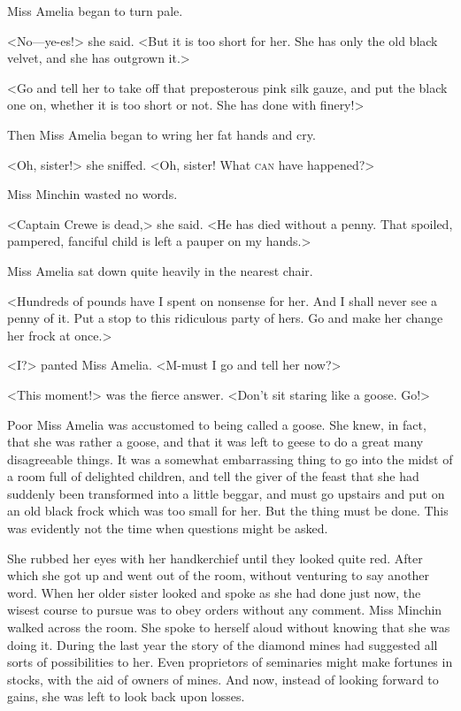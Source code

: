 Miss Amelia began to turn pale.

<No—ye-es!> she said. <But it is too short for her. She has only the old black velvet, and she has outgrown it.>

<Go and tell her to take off that preposterous pink silk gauze, and put the black one on, whether it is too short or not. She has done with finery!>

Then Miss Amelia began to wring her fat hands and cry.

<Oh, sister!> she sniffed. <Oh, sister! What \textsc{can} have happened?>

Miss Minchin wasted no words.

<Captain Crewe is dead,> she said. <He has died without a penny. That spoiled, pampered, fanciful child is left a pauper on my hands.>

Miss Amelia sat down quite heavily in the nearest chair.

<Hundreds of pounds have I spent on nonsense for her. And I shall never see a penny of it. Put a stop to this ridiculous party of hers. Go and make her change her frock at once.>

<I\@?> panted Miss Amelia. <M-must I go and tell her now?>

<This moment!> was the fierce answer. <Don't sit staring like a goose. Go!>

Poor Miss Amelia was accustomed to being called a goose. She knew, in fact, that she was rather a goose, and that it was left to geese to do a great many disagreeable things. It was a somewhat embarrassing thing to go into the midst of a room full of delighted children, and tell the giver of the feast that she had suddenly been transformed into a little beggar, and must go upstairs and put on an old black frock which was too small for her. But the thing must be done. This was evidently not the time when questions might be asked.

She rubbed her eyes with her handkerchief until they looked quite red. After which she got up and went out of the room, without venturing to say another word. When her older sister looked and spoke as she had done just now, the wisest course to pursue was to obey orders without any comment. Miss Minchin walked across the room. She spoke to herself aloud without knowing that she was doing it. During the last year the story of the diamond mines had suggested all sorts of possibilities to her. Even proprietors of seminaries might make fortunes in stocks, with the aid of owners of mines. And now, instead of looking forward to gains, she was left to look back upon losses.

